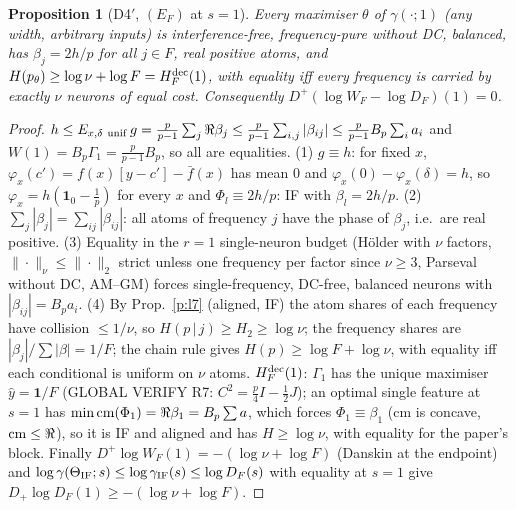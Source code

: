 \documentclass[11pt]{article}
\newtheorem{proposition}{Proposition}[section]\newtheorem{lemma}[proposition]{Lemma}\newtheorem{corollary}[proposition]{Corollary}
\theoremstyle{remark}\newtheorem{remark}[proposition]{Remark}
\begin{document}
\begin{proposition}[D4$'$, $(E_F)$ at $s=1$]\label{p:s1}
Every maximiser $\theta$ of $\gamma(\cdot;1)$ (any width, arbitrary inputs) is interference-free, frequency-pure without DC, balanced, has $\beta_j=2h/p$ for all
$j\in F$, real positive atoms, and $H(p_\theta)\ge\log\nu+\log F=H^{\rm dec}_F(1)$, with equality iff every frequency is carried by exactly $\nu$ neurons of equal cost.
Consequently $D^+(\log W_F-\log D_F)(1)=0$.
\end{proposition}
\begin{proof}
$h\le E_{x,\delta\ {\rm unif}}\,g=\frac p{p-1}\sum_j\Re\beta_j\le\frac p{p-1}\sum_{i,j}|\beta_{ij}|\le\frac p{p-1}B_p\sum_ia_i$ and $W(1)=B_p\Gamma_1=\frac p{p-1}B_p$,
so all are equalities. (1) $g\equiv h$: for fixed $x$, $\varphi_x(c')=f(x)[y-c']-\bar f(x)$ has mean $0$ and $\varphi_x(0)-\varphi_x(\delta)=h$, so
$\varphi_x=h(\mathbf 1_0-\frac1p)$ for every $x$ and $\Phi_l\equiv2h/p$: IF with $\beta_l=2h/p$. (2) $\sum_j|\beta_j|=\sum_{ij}|\beta_{ij}|$: all atoms of
frequency $j$ have the phase of $\beta_j$, i.e.\ are real positive. (3) Equality in the $r=1$ single-neuron budget (Hölder with $\nu$ factors, $\|\cdot\|_\nu\le\|\cdot\|_2$
strict unless one frequency per factor since $\nu\ge3$, Parseval without DC, AM--GM) forces single-frequency, DC-free, balanced neurons with
$|\beta_{ij}|=B_pa_i$. (4) By Prop.~\ref{p:l7} (aligned, IF) the atom shares of each frequency have collision $\le1/\nu$, so $H(p\,|\,j)\ge H_2\ge\log\nu$;
the frequency shares are $|\beta_j|/\sum|\beta|=1/F$; the chain rule gives $H(p)\ge\log F+\log\nu$, with equality iff each conditional is uniform on $\nu$ atoms.
$H^{\rm dec}_F(1)$: $\Gamma_1$ has the unique maximiser $\hat y=\mathbf1/F$ (GLOBAL VERIFY R7: $C^2=\frac p4I-\frac12J$); an optimal single feature at $s=1$ has
$\min\mathrm{cm}(\Phi_1)=\Re\beta_1=B_p\sum a$, which forces $\Phi_1\equiv\beta_1$ (cm is concave, $\mathrm{cm}\le\Re$), so it is IF and aligned and has $H\ge\log\nu$, with equality for the
paper's block. Finally $D^+\log W_F(1)=-(\log\nu+\log F)$ (Danskin at the endpoint) and $\log\gamma(\Theta_{\rm IF};s)\le\log\gamma_{\rm IF}(s)\le\log D_F(s)$ with equality at
$s=1$ give $D_+\log D_F(1)\ge-(\log\nu+\log F)$.
\end{proof}
\end{document}
